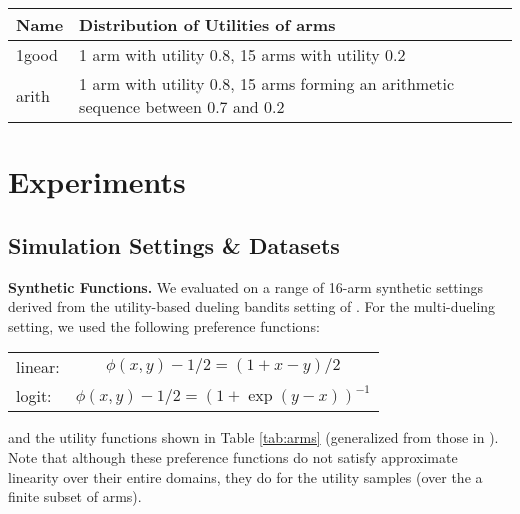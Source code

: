 

\begin{table*}[t]
\centering
\begin{small}
\begin{tabular}{|l|l|}
\hline
Name  & Distribution of Utilities of arms \\ \hline
\hline
1good & 1 arm with utility 0.8, 15 arms with utility 0.2  \\ \hline
arith & 1 arm with utility 0.8, 15 arms forming an arithmetic sequence between 0.7 and 0.2 \\ \hline
\end{tabular}
\end{small}
\caption{16-arm synthetic datasets used for experiments.}
\label{tab:arms}
\vspace{-0.1in}
\end{table*}


\section{Experiments}\label{sec:experiments}

\subsection{Simulation Settings \& Datasets}
\label{sec:data}

\textbf{Synthetic Functions.} We evaluated on a range of 16-arm synthetic settings derived from  the utility-based dueling bandits setting of \citet{ailon2014reducing}. For the multi-dueling setting, we used the following preference functions:
\vspace{-0.1in}
\begin{table}[H]
\centering
\begin{tabular}{lc}
linear:  & $\phi(x, y) - 1/2 = (1+x-y)/2$          \\
logit:   & $\phi(x, y) - 1/2 = (1+\exp{(y-x)})^{-1}$
\end{tabular}
\end{table}
\vspace{-0.2in}
and the utility functions shown in Table \ref{tab:arms} (generalized from those in \citet{ailon2014reducing}). 
Note that although these preference functions do not satisfy approximate linearity over their entire domains, they do for the utility samples (over the a finite subset of arms).


